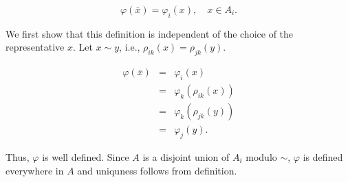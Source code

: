 \documentclass{article}
\theoremstyle{definition}
\theoremstyle{remark}
\begin{document}
\begin{enumerate}[(a)]
        $$\varphi(\bar{x}) = \varphi_i(x),\quad x \in A_i.$$
    
    We first show that this definition is independent of the choice of the representative $x$. Let $x \sim y$, i.e., $\rho_{ik}(x) = \rho_{jk}(y)$. 

    \begin{eqnarray*}
        \varphi(\bar{x}) & = & \varphi_i(x)\\
        & = & \varphi_k(\rho_{ik}(x)) \\
        & = & \varphi_k(\rho_{jk}(y))\\
        & = & \varphi_j(y).
    \end{eqnarray*}

    Thus, $\varphi$ is well defined. Since $A$ is a disjoint union of $A_i$ modulo $\sim$, $\varphi$ is defined everywhere in $A$ and uniquness follows from definition.
\end{enumerate}
\end{document}
